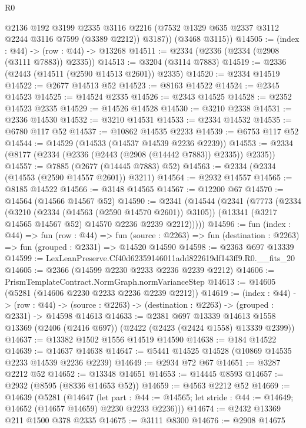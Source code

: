 \begin{lexlean}{R0}
\begin{coremodule}
          @2136
          @192
          @3199
          @2335
          @3116
          @2216
          (@7532 @1329 @635 @2337 @3112 @2244 @3116 @7599 (@3389 @2212))
          @3187))
      (@3468 @3115))
@14505 := (index : @44) -> (row : @44) -> @13268
@14511 := @2334 (@2336 (@2334 (@2908 (@3111 @7883)) @2335))
@14513 := @3204 (@3114 @7883)
@14519 := @2336 (@2443 (@14511 (@2590 @14513 @2601)) @2335)
@14520 := @2334 @14519
@14522 := @2677 @14513 @52
@14523 := @8163 @14522
@14524 := @2345 @14523
@14525 := @14524 @2335
@14526 := @2343 @14525
@14528 := @2352 @14523 @2335
@14529 := @14526 @14528
@14530 := @3210 @2338
@14531 := @2336 @14530
@14532 := @3210 @14531
@14533 := @2334 @14532
@14535 := @6780 @117 @52
@14537 := @10862 @14535 @2233
@14539 := @6753 @117 @52
@14544 := @14529 (@14533 (@14537 @14539 @2236 @2239))
@14553 := @2334 (@8177 (@2334 (@2336 (@2443 (@2908 (@14442 @7883)) @2335)) @2335))
@14557 := @7885 (@2677 (@14445 @7883) @52)
@14563 := @2334 (@2334 (@14553 (@2590 @14557 @2601)) @3211)
@14564 := @2932 @14557
@14565 := @8185 @14522
@14566 := @3148 @14565
@14567 := @12200 @67
@14570 := @14564 (@14566 @14567 @52)
@14590 := @2341
    (@14544
      (@2341
        (@7773
          (@2334
            (@3210 (@2334 (@14563 (@2590 @14570 @2601)) @3105))
            (@13341 (@3217 @14565 @14567 @52) @14570 @2236 @2239 @2212)))))
@14596 := fun (index : @44) =>
  fun (row : @44) =>
  fun (source : @2263) => fun (destination : @2263) => fun (grouped : @2331) => @14520 @14590
@14598 := @2363 @697 @13339
@14599 := LexLeanPreserve.Cf40d62359146011add822619df143ff9.R0.__fits_20
@14605 := @2366 (@14599 @2230 @2233 @2236 @2239 @2212)
@14606 := PrismTemplateContract.NormGraph.normVarianceStep
@14613 := @14605 (@5281 (@14606 @2230 @2233 @2236 @2239 @2212))
@14619 := (index : @44) ->
  (row : @44) -> (source : @2263) -> (destination : @2263) -> (grouped : @2331) -> @14598 @14613
@14633 := @2381
    @697
    @13339
    @14613
    @1558
    @13369
    (@2406 (@2416 @697))
    (@2422 (@2423 (@2424 @1558) @13339 @2399))
@14637 := @13382 @1502 @1556 @14519 @14590
@14638 := @184 @14522
@14639 := @14637 @14638
@14647 := @5441 @14525 @14528 (@10869 @14535 @2233 @14539 @2236 @2239)
@14649 := @2934 @72 @67
@14651 := @3287 @2212 @52
@14652 := @13348 @14651
@14653 := @14445 @8593
@14657 := @2932 (@8595 (@8336 @14653 @52))
@14659 := @4563 @2212 @52
@14669 := @14639
    (@5281
      (@14647
        (let part : @44 := @14565;
        let stride : @44 := @14649; @14652 (@14657 @14659) @2230 @2233 @2236)))
@14674 := @2432 @13369 @211 @1500 @378 @2335
@14675 := @3111 @8300
@14676 := @2908 @14675

\end{coremodule}
\end{lexlean}
